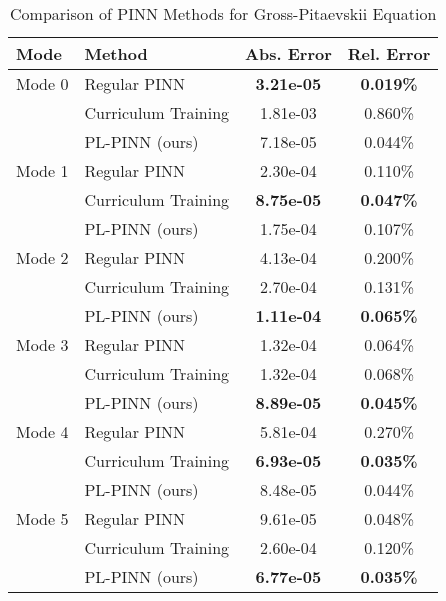 \begin{table}[htbp]
\centering
\caption{Comparison of PINN Methods for Gross-Pitaevskii Equation}
\label{tab:pinn_comparison}
\begin{tabular}{llcc}
\toprule
Mode & Method & Abs. Error & Rel. Error \\
\midrule
Mode 0 & Regular PINN & \textbf{3.21e-05} & \textbf{0.019\%} \\
 & Curriculum Training & 1.81e-03 & 0.860\% \\
 & PL-PINN (ours) & 7.18e-05 & 0.044\% \\
\midrule
Mode 1 & Regular PINN & 2.30e-04 & 0.110\% \\
 & Curriculum Training & \textbf{8.75e-05} & \textbf{0.047\%} \\
 & PL-PINN (ours) & 1.75e-04 & 0.107\% \\
\midrule
Mode 2 & Regular PINN & 4.13e-04 & 0.200\% \\
 & Curriculum Training & 2.70e-04 & 0.131\% \\
 & PL-PINN (ours) & \textbf{1.11e-04} & \textbf{0.065\%} \\
\midrule
Mode 3 & Regular PINN & 1.32e-04 & 0.064\% \\
 & Curriculum Training & 1.32e-04 & 0.068\% \\
 & PL-PINN (ours) & \textbf{8.89e-05} & \textbf{0.045\%} \\
\midrule
Mode 4 & Regular PINN & 5.81e-04 & 0.270\% \\
 & Curriculum Training & \textbf{6.93e-05} & \textbf{0.035\%} \\
 & PL-PINN (ours) & 8.48e-05 & 0.044\% \\
\midrule
Mode 5 & Regular PINN & 9.61e-05 & 0.048\% \\
 & Curriculum Training & 2.60e-04 & 0.120\% \\
 & PL-PINN (ours) & \textbf{6.77e-05} & \textbf{0.035\%} \\
\bottomrule
\end{tabular}
\end{table}